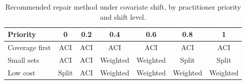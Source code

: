 \begin{table}[t]\centering
\caption{Recommended repair method under covariate shift, by practitioner priority and shift level.}
\label{tab:guide_covariate}
\begin{tabular}{lcccccc}
\toprule
Priority & 0 & 0.2 & 0.4 & 0.6 & 0.8 & 1 \\
\midrule
Coverage first & ACI & ACI & ACI & ACI & ACI & ACI \\
Small sets & ACI & ACI & Weighted & Weighted & Split & Split \\
Low cost & Split & ACI & Weighted & Weighted & Weighted & Weighted \\
\bottomrule
\end{tabular}
\end{table}